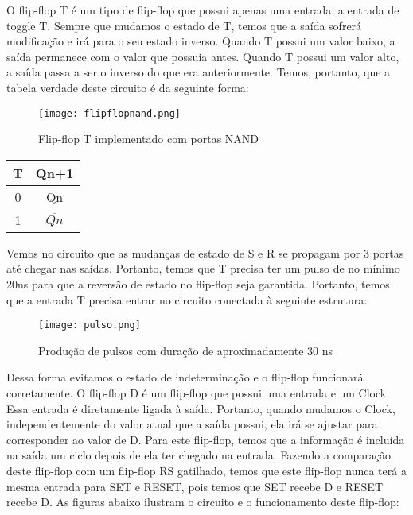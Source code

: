 \documentclass[12pt]{article}
\begin{document}
O flip-flop T é um tipo de flip-flop que possui apenas uma entrada: a entrada de toggle T. Sempre que mudamos o estado de T, temos que a saída sofrerá modificação e irá para o seu estado inverso. Quando T possui um valor baixo, a saída permanece com o valor que possuia antes. Quando T possui um valor alto, a saída passa a ser o inverso do que era anteriormente. Temos, portanto, que a tabela verdade deste circuito é da seguinte forma: 

\begin{figure}[H]
	\centering
	\texttt{[image: flipflopnand.png]}
	\caption{Flip-flop T implementado com portas NAND}
	\label{fig:flipflopt}
\end{figure}

\begin{table}[H]
	\centering
	\begin{tabular}{|c|c|}
		\cline{1-2}
		\multicolumn{1}{|c|}{T} & \multicolumn{1}{|c|}{Qn+1} \\
		\hline
		0 & Qn \\
		\hline
		1 & $\overline{Qn}$\\
		\hline
	\end{tabular}
	
\end{table} 


Vemos no circuito que as mudanças de estado de S e R se propagam por 3 portas até chegar nas saídas. Portanto, temos que T precisa ter um pulso de no mínimo 20ns para que a reversão de estado no flip-flop seja garantida. Portanto, temos que a entrada T precisa entrar no circuito conectada à seguinte estrutura:

\begin{figure}[H]
	\centering
	\texttt{[image: pulso.png]}
	\caption{Produção de pulsos com duração de aproximadamente 30 ns}
	\label{fig:pulso}
\end{figure}

Dessa forma evitamos o estado de indeterminação e o flip-flop funcionará corretamente.
O flip-flop D é um flip-flop que possui uma entrada e um Clock. Essa entrada é diretamente ligada à saída. Portanto, quando mudamos o Clock, independentemente do valor atual que a saída possui, ela irá se ajustar para corresponder ao valor de D. Para este flip-flop, temos que a informação é incluída na saída um ciclo depois de ela ter chegado na entrada.
Fazendo a comparação deste flip-flop com um flip-flop RS gatilhado, temos que este flip-flop nunca terá a mesma entrada para SET e RESET, pois temos que SET recebe D e RESET recebe D. As figuras abaixo ilustram o circuito e o funcionamento deste flip-flop:
\end{document}
